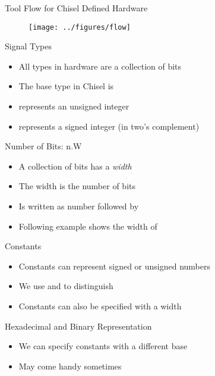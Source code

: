 \begin{frame}[fragile]{Tool Flow for Chisel Defined Hardware}
\begin{figure}
    \centering
    \texttt{[image: ../figures/flow]}
\end{figure}
\end{frame}

\begin{frame}[fragile]{Signal Types}
\begin{itemize}
\item All types in hardware are a collection of bits
\item The base type in Chisel is 
\item {} represents an unsigned integer
\item {} represents a signed integer (in two's complement)
\end{itemize}
\end{frame}

\begin{frame}[fragile]{Number of Bits: n.W}
\begin{itemize}
\item A collection of bits has a \emph{width}
\item The width is the number of bits
\item Is written as number followed by 
\item Following example shows the width of 
\end{itemize}
\end{frame}

\begin{frame}[fragile]{Constants}
\begin{itemize}
\item Constants can represent signed or unsigned numbers
\item We use  and  to distinguish
\end{itemize}
\begin{itemize}
\item Constants can also be specified with a width
\end{itemize}
\end{frame}

\begin{frame}[fragile]{Hexadecimal and Binary Representation}
\begin{itemize}
\item We can specify constants with a different base
\item May come handy sometimes
\end{itemize}
\end{frame}

